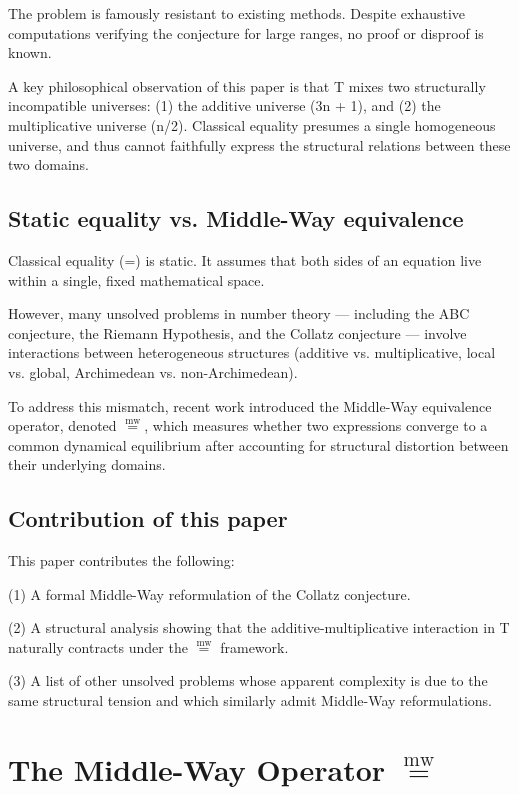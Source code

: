 \documentclass[11pt]{article}
\newcommand{\mweq}{\mathrel{\overset{\mathrm{mw}}{=}}}
\theoremstyle{definition}
\theoremstyle{remark}
\begin{document}
The problem is famously resistant to existing methods. Despite exhaustive
computations verifying the conjecture for large ranges, no proof or
disproof is known.

A key philosophical observation of this paper is that T mixes two
structurally incompatible universes:
(1) the additive universe (3n + 1), and
(2) the multiplicative universe (n/2).
Classical equality presumes a single homogeneous universe, and thus
cannot faithfully express the structural relations between these two
domains.

\subsection{Static equality vs. Middle-Way equivalence}

Classical equality (=) is static. It assumes that both sides of an
equation live within a single, fixed mathematical space.

However, many unsolved problems in number theory --- including the ABC
conjecture, the Riemann Hypothesis, and the Collatz conjecture ---
involve interactions between heterogeneous structures (additive vs.
multiplicative, local vs. global, Archimedean vs. non-Archimedean).

To address this mismatch, recent work introduced the Middle-Way
equivalence operator, denoted $\mweq$, which measures whether two
expressions converge to a common dynamical equilibrium after accounting
for structural distortion between their underlying domains.

\subsection{Contribution of this paper}

This paper contributes the following:

(1) A formal Middle-Way reformulation of the Collatz conjecture.

(2) A structural analysis showing that the additive-multiplicative
interaction in T naturally contracts under the $\mweq$ framework.

(3) A list of other unsolved problems whose apparent complexity
is due to the same structural tension and which similarly admit
Middle-Way reformulations.

\section{The Middle-Way Operator $\mweq$}
\end{document}
